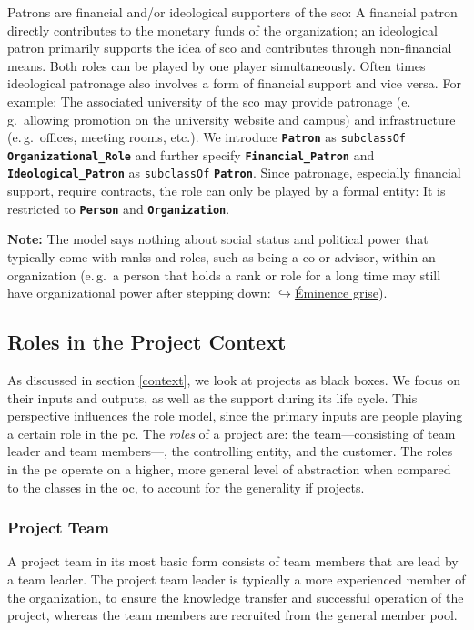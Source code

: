 \documentclass[a4paper, DIV=13, BCOR=0cm]{scrbook}
\newcommand{\eg}{e.\,g.\ }
\newcommand{\class}[1]{\texttt{\textbf{#1}}}
\newcommand{\relation}[1]{\texttt{#1}}
\newcommand{\link}[2]{\href{#1}{$\hookrightarrow$#2}}
\begin{document}
Patrons are financial and/or ideological supporters of the \gls{sco}: A financial patron directly contributes to the monetary funds of the organization; an ideological patron primarily supports the idea of \gls{sco} and contributes through non-financial means. Both roles can be played by one player simultaneously. Often times ideological patronage also involves a form of financial support and vice versa. For example: The associated university of the \gls{sco} may provide patronage (\eg allowing promotion on the university website and campus) and infrastructure (\eg offices, meeting rooms, etc.). We introduce \class{Patron} as \relation{subclassOf} \class{Organizational\_Role} and further specify \class{Financial\_Patron} and \class{Ideological\_Patron} as \relation{subclassOf} \class{Patron}. Since patronage, especially financial support, require contracts, the role can only be played by a formal entity: It is restricted to \class{Person} and \class{Organization}.

\begin{mdframed}
	\textbf{Note:} The model says nothing about social status and political power that typically come with ranks and roles, such as being a \gls{co} or advisor, within an organization (\eg a person that holds a rank or role for a long time may still have organizational power after stepping down: \link{https://en.wikipedia.org/wiki/Éminence_grise}{Éminence grise}).
\end{mdframed}

\subsection{Roles in the Project Context}
As discussed in section \ref{context}, we look at projects as black boxes. We focus on their inputs and outputs, as well as the support during its life cycle. This perspective influences the role model, since the primary inputs are people playing a certain role in the \gls{pc}. The \textit{roles} of a project are: the team---consisting of team leader and team members---, the controlling entity, and the customer. The roles in the \gls{pc} operate on a higher, more general level of abstraction when compared to the classes in the \gls{oc}, to account for the generality if projects.

\subsubsection{Project Team}
A project team in its most basic form consists of team members that are lead by a team leader. The project team leader is typically a more experienced member of the organization, to ensure the knowledge transfer and successful operation of the project, whereas the team members are recruited from the general member pool.
\end{document}
